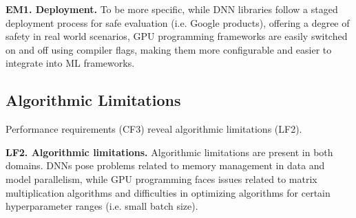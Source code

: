 \textbf{EM1. Deployment.}
To be more specific, while DNN libraries follow a staged deployment process for safe evaluation (i.e.
Google products), offering a degree of safety in real world scenarios, GPU programming frameworks are
easily switched on and off using compiler flags, making them more configurable and easier to integrate
into ML frameworks.

\subsection*{Algorithmic Limitations}
Performance requirements (CF3) reveal algorithmic limitations (LF2).

\textbf{LF2. Algorithmic limitations.}
Algorithmic limitations are present in both domains. DNNs pose problems related to memory management in data and model parallelism,
while GPU programming faces issues related to matrix multiplication algorithms and difficulties in optimizing
algorithms for certain hyperparameter ranges (i.e. small batch size).



